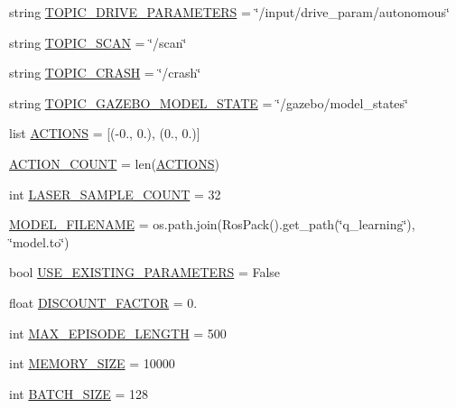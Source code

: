 \begin{DoxyCompactItemize}
\item 
string \hyperlink{namespaceparameters_a855cb11de60782b8e9997af80bdab518}{T\+O\+P\+I\+C\+\_\+\+D\+R\+I\+V\+E\+\_\+\+P\+A\+R\+A\+M\+E\+T\+E\+RS} = \char`\"{}/input/drive\+\_\+param/autonomous\char`\"{}
\item 
string \hyperlink{namespaceparameters_a28de242cdbba10666eb0c95aaef6812b}{T\+O\+P\+I\+C\+\_\+\+S\+C\+AN} = \char`\"{}/scan\char`\"{}
\item 
string \hyperlink{namespaceparameters_a5e392ed4d998f10824bfd96a0eae2988}{T\+O\+P\+I\+C\+\_\+\+C\+R\+A\+SH} = \char`\"{}/crash\char`\"{}
\item 
string \hyperlink{namespaceparameters_a9d4157266ec0afde91ab7d58be4f688d}{T\+O\+P\+I\+C\+\_\+\+G\+A\+Z\+E\+B\+O\+\_\+\+M\+O\+D\+E\+L\+\_\+\+S\+T\+A\+TE} = \char`\"{}/gazebo/model\+\_\+states\char`\"{}
\item 
list \hyperlink{namespaceparameters_a585a25d0a26bcab4242d2e3fb1c1f93e}{A\+C\+T\+I\+O\+NS} = \mbox{[}(-\/0., 0.), (0., 0.)\mbox{]}
\item 
\hyperlink{namespaceparameters_ae4be13f6dac91f471da3efb4618a54c1}{A\+C\+T\+I\+O\+N\+\_\+\+C\+O\+U\+NT} = len(\hyperlink{namespaceparameters_a585a25d0a26bcab4242d2e3fb1c1f93e}{A\+C\+T\+I\+O\+NS})
\item 
int \hyperlink{namespaceparameters_a24735dce78cf9899cf1ec4bda2ea4eac}{L\+A\+S\+E\+R\+\_\+\+S\+A\+M\+P\+L\+E\+\_\+\+C\+O\+U\+NT} = 32
\item 
\hyperlink{namespaceparameters_aff8b0668384f3fa2d1212d3bd0ff42fa}{M\+O\+D\+E\+L\+\_\+\+F\+I\+L\+E\+N\+A\+ME} = os.\+path.\+join(Ros\+Pack().get\+\_\+path(\char`\"{}q\+\_\+learning\char`\"{}), \char`\"{}model.\+to\char`\"{})
\item 
bool \hyperlink{namespaceparameters_a0cffcb215ac12a1700baedb1a13ec8d5}{U\+S\+E\+\_\+\+E\+X\+I\+S\+T\+I\+N\+G\+\_\+\+P\+A\+R\+A\+M\+E\+T\+E\+RS} = False
\item 
float \hyperlink{namespaceparameters_a70176024e0f585c846365800f1c7819c}{D\+I\+S\+C\+O\+U\+N\+T\+\_\+\+F\+A\+C\+T\+OR} = 0.
\item 
int \hyperlink{namespaceparameters_aa473cc3b100416af3310c6c5a6d19570}{M\+A\+X\+\_\+\+E\+P\+I\+S\+O\+D\+E\+\_\+\+L\+E\+N\+G\+TH} = 500
\item 
int \hyperlink{namespaceparameters_a49f1ad074b5710a98fc783c5627ddade}{M\+E\+M\+O\+R\+Y\+\_\+\+S\+I\+ZE} = 10000
\item 
int \hyperlink{namespaceparameters_a2d37d9950f7a887014021ab455282af6}{B\+A\+T\+C\+H\+\_\+\+S\+I\+ZE} = 128

\end{DoxyCompactItemize}

